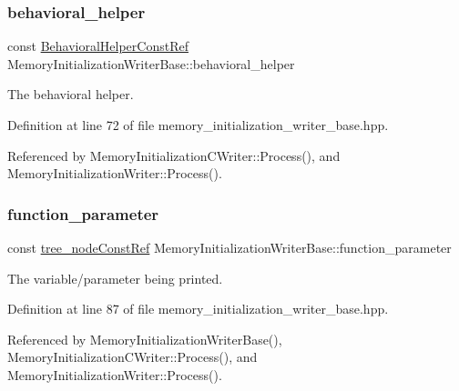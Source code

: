 \subsubsection{\texorpdfstring{behavioral\+\_\+helper}{behavioral\_helper}}
{\footnotesize\ttfamily const \hyperlink{behavioral__helper_8hpp_aae973b54cac87eef3b27442aa3e1e425}{Behavioral\+Helper\+Const\+Ref} Memory\+Initialization\+Writer\+Base\+::behavioral\+\_\+helper\hspace{0.3cm}{\ttfamily [protected]}}



The behavioral helper. 



Definition at line 72 of file memory\+\_\+initialization\+\_\+writer\+\_\+base.\+hpp.



Referenced by Memory\+Initialization\+C\+Writer\+::\+Process(), and Memory\+Initialization\+Writer\+::\+Process().

\mbox{\label{classMemoryInitializationWriterBase_a2bdd8c25a0b756f6290cb48a6b9d0303}} 
\subsubsection{\texorpdfstring{function\+\_\+parameter}{function\_parameter}}
{\footnotesize\ttfamily const \hyperlink{tree__node_8hpp_a3cf5d02292c940f3892425a5b5fdec3c}{tree\+\_\+node\+Const\+Ref} Memory\+Initialization\+Writer\+Base\+::function\+\_\+parameter\hspace{0.3cm}{\ttfamily [protected]}}



The variable/parameter being printed. 



Definition at line 87 of file memory\+\_\+initialization\+\_\+writer\+\_\+base.\+hpp.



Referenced by Memory\+Initialization\+Writer\+Base(), Memory\+Initialization\+C\+Writer\+::\+Process(), and Memory\+Initialization\+Writer\+::\+Process().

\mbox{\label{classMemoryInitializationWriterBase_ac424618ba0c88d441a905b6cbf891b65}} 
